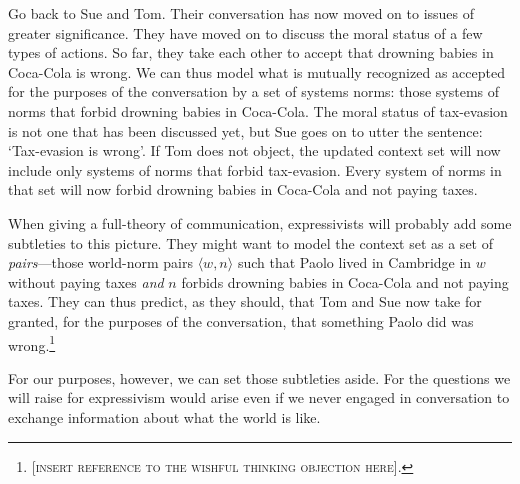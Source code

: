 \documentclass[11pt,article,oneside]{memoir}
\begin{document}
Go back to Sue and Tom. Their conversation has now moved on to issues of greater significance. They have moved on to discuss the moral status of a few types of actions. So far, they take each other to accept that drowning babies in Coca-Cola is wrong. We can thus model what is mutually recognized as accepted for the purposes of the conversation by a set of systems norms: those systems of norms that forbid drowning babies in Coca-Cola. The moral status of tax-evasion is not one that has been discussed yet, but Sue goes on to utter the sentence: `Tax-evasion is wrong'. If Tom does not object, the updated context set will now include only systems of norms that forbid tax-evasion. Every system of norms in that set will now forbid drowning babies in Coca-Cola and not paying taxes. 

When giving a full-theory of communication, expressivists will probably add some subtleties to this picture. They might want to model the context set as a set of \emph{pairs}---those world-norm pairs $\langle w, n \rangle$ such that Paolo lived in Cambridge in $w$ without paying taxes \emph{and} $n$ forbids drowning babies in Coca-Cola and not paying taxes. They can thus predict, as they should, that Tom and Sue now take for granted, for the purposes of the conversation, that something Paolo did was wrong.\footnote{[\textsc{insert reference to the wishful thinking objection here}].}

For our purposes, however, we can set those subtleties aside. For the questions we will raise for expressivism would arise even if we never engaged in conversation to exchange information about what the world is like.  


 

\printbibliography
\end{document}
